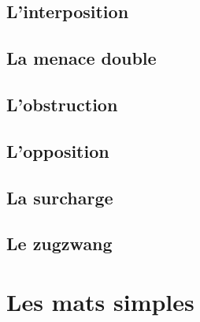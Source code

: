 \documentclass[a5paper,openany,twocolumn]{book}
\begin{document}
{\chapter{L'interposition}

\lipsum[4]

\chapter{La menace double}

\lipsum[4]

\chapter{L'obstruction}

\lipsum[4]

\chapter{L'opposition}

\lipsum[4]

\chapter{La surcharge}

\lipsum[4]

\chapter{Le zugzwang}

\lipsum[4]


\part{Les mats simples}

}
\end{document}
